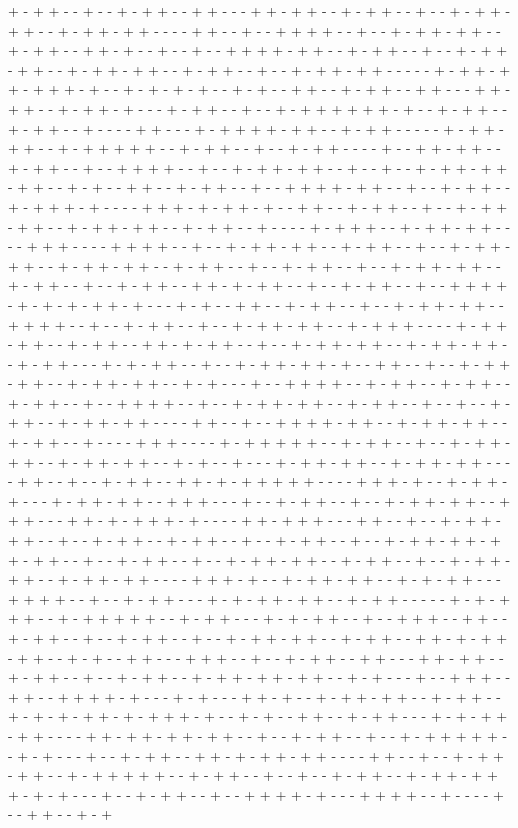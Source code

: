 + - + + - - + - - + - + + - - + + - - - + + - + + - - + - + + - - + - - + - + + - + + - - + - + + - + + - - - - + + - - + - - + + + + - - + - - + - + + - + + - - + - + + - - + + - + - - + - - + - - + + + + - + + - - + - + + - - + - - + - + + - + + - - + - + + - + + - - + - + + - - + - - + - + + - + + - - - - - + - + + - + + - + + + - + - - + - + - + - + - - + - + - - + + - - + - + + - - + + - - - + + - + + - - + - + + - + - - - + - + + - - + - - + - + + + + + + - + - - + - + + - - + - + + - - + - - - - + + - - - + - + + + + - + + - - + - + + - - - - - + - + + - + + - - + - + + + + + - - + - + + - - + - - + - + + - - - - + - - + + - + + - - + - + + - - + - - + + + + - - + - - + - + + - + + - - + - - + - - + - + + - + + - + + - - + - + - - + + - - + - + + - - + - - + + + + - + + - - + - - + - + + - - + - + + + - + - - - - + + + - + - + + - + - - + + - - + - + + - - + - - + - + + - + + - - + - + + - + + - - + - + + - - + - - - - + - + + + - - + - + + - + + - - - - + + + - - - - + + + + - - + - - + - + + - + + - - + - + + - - + - - + - + + - + + - - + - + + - + + - - + - + + - - + - - + - + + - - + - - + - + + - + + - - + - + + - - + - - + - + + - - + + - + - + + - - + - - + - + + - - + - - + + + + - + - + - + - + + - + - - - + - + - - + + - - + - + + - - + - - + - + + - + + - - + + + + - - + - - + - + + - - + - - + - + + - + + - - + - + + + - - - - + - + + - + + - - + - + + - - + + - + - + + - - + - - + - + + - + + - - + - + + - + + - - + - + + - - - + - + - + + - - + - - + - + + - + + - + - - + + - - + - - + - + + - + + - - + - + + - + + - - + - + - - - + - - + + + + - - + - + + - - + - + + - - + - + + - - + - - + + + + - - + - - + - + + - + + - - + - + + - - + - - + - - + - + + - - + - + + - + + - - - - + + - - + - - + + + + - + + - - + - + + - + + - - + - + + - - + - - - - + + + - - - - + - + + + + + - - + - + + - - + - - + - + + - + + - - + - + + - + + - - + - + - - + - - - + - + + - + + - - + - + + - + + - - - - + + - - + - - + - + + - - + + - + - + + + + + - - - - + + + - + - - + - + + - + - - - + - + + - + + - - + + + - - - + - - + - + + - - + - - + - + + - + + - - + + + - - - + + - + - + + + - + - - - - + + - + + + - - - + + - - + - - + - + + - + + - - + - - + - + + - - + - + + - - + - - + - + + - - + - - + - + + - + + - + + - + + - - + - - + - + + - - + - - + - + + - + + - - + - + + - - + - - + - + + - + + - - + - + + - + + - - - - + + + - + - - + - + + - + + - - + - + - + + - - - + + + + - - + - - + - + + - - - + - + - + + - + + - - + - + + - - - - - + - + - + + + - - + - + + + + + - - + - + + - - - + - + - + + - - + - - + + + - - + + - - + - + + - - + - - + - + + - - + - - + - + + - + + - - + - + + - - + + - + - + + - + + - - + - + - - + + - - - + + + - - + - - + - + + - - + + - - - + + - + + - - + - + + - - + - - + - + + - - + - + + - + + - + + - - + - + - - - + - - + + + - - + + - - + + + + - + - - - + - + - - - + + - + - - + - + + - + + - - + - + + - - + - + - + - + + - + - + + + - + - - + - + - - + + - - + - + + - - - + - + - + + - + + - - - - + + - + + - + + - + + - - + - - + - + + - - + - - + - + + + + + - - + - + - - - + - - + - + + - - + + - + - + + - + + - - - - + + - - + - - + - + + - + + - - + - + + + + + - - + - + + - - + - - + - - + - + + - - + - + + - + + + - + - + - - - + - - + - + + - - + - - + + + + - + - - - + + + + - - + - - - - + - - + + - - + - + 